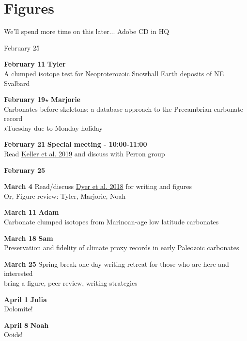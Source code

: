 \documentclass{article}
\begin{document}
\section*{Figures}
We'll spend more time on this later... Adobe CD in HQ

\vspace{10pt}
\begin{labeling}{February 25 \hspace{1.5cm}}
\item [\textbf{February 11}] \textbf{Tyler}\\ A clumped isotope test for Neoproterozoic Snowball Earth deposits of NE Svalbard
\item [\textbf{February 19$\star$}] \textbf{Marjorie}\\Carbonates before skeletons: a database approach to the Precambrian carbonate record \\ $\star$Tuesday due to Monday holiday
\item [{\color{red}\textbf{February 21}}] {\color{red}\textbf{Special meeting - 10:00-11:00}\\ Read \href{https://brenhinkeller.github.io/files/GreatUnconformity2019.pdf}{Keller et al. 2019} and discuss with Perron group}
\item [\textbf{February 25}]
\item [\color{violet}\textbf{March 4}] {\color{violet} Read/discuss} \href{http://www.blakedyer.com/papers/Dyer2018.pdf}{Dyer et al. 2018} {\color{violet}for writing and figures}\\Or, {\color{MidnightBlue}Figure review: Tyler, Marjorie, Noah}
\item [\textbf{March 11}] \textbf{Adam}\\Carbonate clumped isotopes from Marinoan-age low latitude carbonates
\item [\textbf{March 18}] \textbf{Sam}\\Preservation and fidelity of climate proxy records in early Paleozoic carbonates
\item [\color{ForestGreen}\textbf{March 25}] {\color{ForestGreen} Spring break one day writing retreat for those who are here and interested}\\{\color{MidnightBlue} bring a figure}, peer review, {\color{BurntOrange}writing strategies}
\item [\textbf{April 1}] \textbf{Julia} \\
Dolomite!
\item [\textbf{April 8}] \textbf{Noah}\\Ooids!

\end{labeling}
\end{document}
